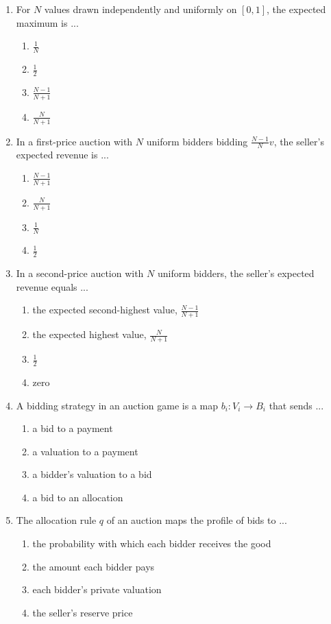 \documentclass[11pt]{article}
\begin{document}
\begin{enumerate}[itemsep=6pt]
  \begin{enumerate}
    \item the seller earns the most
    \item no one ever wins
    \item everyone pays the same
    \item the bidder who values the item most wins it
  \end{enumerate}
  \item For \(N\) values drawn independently and uniformly on \([0,1]\), the expected maximum is ...
  \begin{enumerate}
    \item \(\frac{1}{N}\)
    \item \(\frac{1}{2}\)
    \item \(\frac{N-1}{N+1}\)
    \item \(\frac{N}{N+1}\)
  \end{enumerate}
  \item In a first-price auction with \(N\) uniform bidders bidding \(\frac{N-1}{N} v\), the seller's expected revenue is ...
  \begin{enumerate}
    \item \(\frac{N-1}{N+1}\)
    \item \(\frac{N}{N+1}\)
    \item \(\frac{1}{N}\)
    \item \(\frac{1}{2}\)
  \end{enumerate}
  \item In a second-price auction with \(N\) uniform bidders, the seller's expected revenue equals ...
  \begin{enumerate}
    \item the expected second-highest value, \(\frac{N-1}{N+1}\)
    \item the expected highest value, \(\frac{N}{N+1}\)
    \item \(\frac{1}{2}\)
    \item zero
  \end{enumerate}
  \item A bidding strategy in an auction game is a map \(b_i: V_i \to B_i\) that sends ...
  \begin{enumerate}
    \item a bid to a payment
    \item a valuation to a payment
    \item a bidder's valuation to a bid
    \item a bid to an allocation
  \end{enumerate}
  \item The allocation rule \(q\) of an auction maps the profile of bids to ...
  \begin{enumerate}
    \item the probability with which each bidder receives the good
    \item the amount each bidder pays
    \item each bidder's private valuation
    \item the seller's reserve price
  \end{enumerate}
\end{enumerate}
\end{document}
